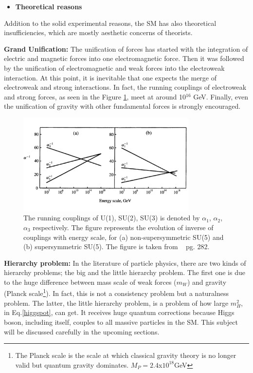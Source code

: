 \begin{itemize}
  \item \textbf{Theoretical reasons}
\end{itemize}
Addition to the solid experimental reasons, the SM has also theoretical insufficiencies, which are mostly aesthetic concerns of theorists.

\textbf{Grand Unification:}
The unification of forces has started with the integration of electric and magnetic forces into one electromagnetic force. Then it was followed by the unification of electromagnetic and weak forces into the electroweak interaction. At this point, it is inevitable that one expects the merge of electroweak and strong interactions. In fact, the running couplings of electroweak and strong forces, as seen in the Figure \ref{fig:GUT}, meet at around 10$^{16}$ GeV. Finally, even the unification of gravity with other fundamental forces is strongly encouraged. 
\begin{figure}[!hb]
\centering
  \includegraphics[width=0.8\textwidth]{Plots/BSM/GUTBoth.pdf}
  \caption{ The running couplings of U(1), SU(2), SU(3) is denoted by $\alpha_1$, $\alpha_2$, $\alpha_3$ respectively. The figure represents the evolution of inverse of couplings with energy scale, for (a) non-supersymmetric SU(5) and (b) supersymmetric SU(5). The figure is taken from ~\cite{perkins} pg. 282.
  }
  \label{fig:GUT}
\end{figure}
\textbf{Hierarchy problem:}
In the literature of particle physics, there are two kinds of hierarchy problems; the big and the little hierarchy problem. The first one is due to the huge difference between mass scale of weak forces ($m_W$) and gravity (Planck scale\footnote{The Planck scale is the scale at which classical gravity theory is no longer valid but quantum gravity dominates. $M_P=2.4$x$10^{18}$GeV}).
In fact, this is not a consistency problem but a naturalness problem. The latter, the little hierarchy problem, is a problem of how large $m_{H}^2$, in Eq.\ref{higgspot}, can get. It receives huge quantum corrections because Higgs boson, including itself, couples to all massive particles in the SM. This subject will be discussed carefully in the upcoming sections.

